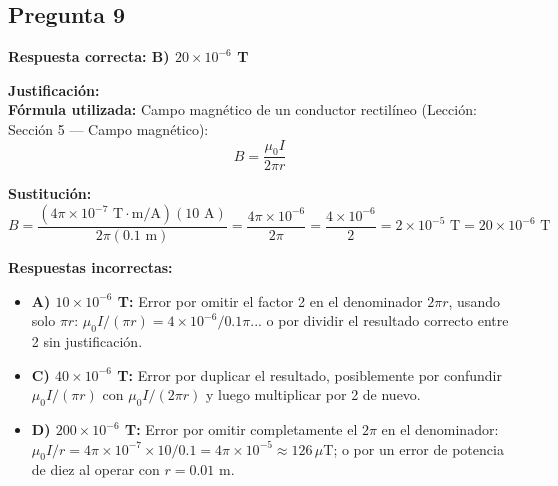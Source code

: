 \begin{respuestabox}
\subsection{Pregunta 9}
\textcolor{verdecorrecto}{\textbf{Respuesta correcta: B) $20 \times 10^{-6}$ T}}

\textbf{Justificación:}\\
\textbf{Fórmula utilizada:} Campo magnético de un conductor rectilíneo (Lección: Sección 5 — Campo magnético):
$$B = \frac{\mu_0 I}{2\pi r}$$

\textbf{Sustitución:}
$$B = \frac{(4\pi \times 10^{-7} \text{ T}\cdot\text{m/A})(10 \text{ A})}{2\pi (0.1 \text{ m})} = \frac{4\pi \times 10^{-6}}{2\pi} = \frac{4 \times 10^{-6}}{2} = 2 \times 10^{-5} \text{ T} = 20 \times 10^{-6} \text{ T}$$

\textbf{Respuestas incorrectas:}
\begin{itemize}
    \item \textbf{A) $10 \times 10^{-6}$ T:} Error por omitir el factor 2 en el denominador $2\pi r$, usando solo $\pi r$: $\mu_0 I / (\pi r) = 4\times10^{-6} / 0.1\pi$... o por dividir el resultado correcto entre 2 sin justificación.
    \item \textbf{C) $40 \times 10^{-6}$ T:} Error por duplicar el resultado, posiblemente por confundir $\mu_0 I / (\pi r)$ con $\mu_0 I / (2\pi r)$ y luego multiplicar por 2 de nuevo.
    \item \textbf{D) $200 \times 10^{-6}$ T:} Error por omitir completamente el $2\pi$ en el denominador: $\mu_0 I / r = 4\pi\times10^{-7}\times10/0.1 = 4\pi\times10^{-5} \approx 126\,\mu$T; o por un error de potencia de diez al operar con $r = 0.01$ m.
\end{itemize}
\end{respuestabox}

